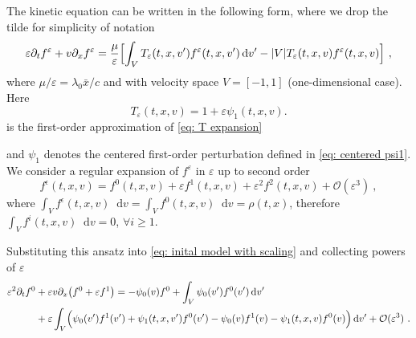 \documentclass[11pt,twoside]{article}
\numberwithin{equation}{section}
\newcommand*\diff{\mathop{}\!\mathrm{d}}
\theoremstyle{plain}
\theoremstyle{nonumberplain}
\newcommand{\e}{\epsilon}
\begin{document}
The kinetic equation can be written in the following form, where we  drop the tilde for simplicity of notation 
{
\begin{equation}
    \varepsilon \partial_t f^\varepsilon+{v}\partial_x f^\varepsilon = \frac{\mu}{\varepsilon}\Bigl[\int_V T_\varepsilon(t,x,v')f^\varepsilon(t,x,v')\diff v'-|V|T_\varepsilon(t,x,v)f^\varepsilon(t,x,v)\Bigr]\ , \label{eq: inital model with scaling}
\end{equation}}where $\mu/\varepsilon=\lambda_0 \bar{x}/c$ and with velocity space \( V = [-1,1] \) (one-dimensional case). 
Here 
\begin{equation}\label{eq: T app}
T_\varepsilon(t,x,v)
=
1+\varepsilon\psi_1(t,x,v).
\end{equation} 
is the first-order approximation of \eqref{eq: T expansion}
{and \(\psi_1\) denotes the centered first-order perturbation defined in \eqref{eq: centered psi1}.
We consider a regular expansion of $f^\varepsilon$ in $\varepsilon$ up to second order
\begin{equation*}
f^\e(t,{x},{v})=f^0(t,{x},{v})+\varepsilon f^1(t,{x},{v})+\varepsilon^2 f^2(t,{x},{v})+\mathcal{O}(\varepsilon^3)\ , 
\end{equation*}
where $\int_V f^\e(t,{x},{v})\diff {v} = \int_V f^0(t,{x},{v})\diff {v} = \rho(t,{x})$, therefore $\int_V f^i(t,{x},{v})\diff {v}=0$, $\forall i\geq 1$.





Substituting this ansatz into \eqref{eq: inital model with scaling} and collecting powers of $\varepsilon$
\iffalse
{\begin{align*}
    \varepsilon^2\partial_t f^0&+\varepsilon{v}\partial_x\big(f^0+\varepsilon f^1  \big) 
    =-\psi_0(v) f^0+\int_V\psi_0(v')f^0(v')\diff v'\\
    &+\varepsilon\int_V\Bigl(\psi_0(v')f^1(v')+\psi_1(t,x,v')f^0(v')-\psi_0(v)f^1(v)-\psi_1(t,x,v)f^0(v) \Bigr)\diff v'+{\mathcal{O}(\varepsilon^3)}
      \ .
\end{align*}}

}
\end{document}
